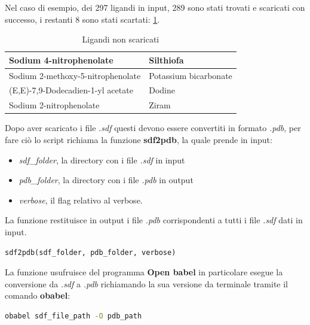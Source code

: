 Nel caso di esempio, dei 297 ligandi in input, 289 sono stati trovati e scaricati con successo, i restanti 8 sono stati scartati: \ref{tab:Ligandi scartati}.

\begin{table}[H]
    \centering
    \begin{tabular}{|l|l|}
    \hline
    Sodium 4-nitrophenolate & Silthiofa \\ \hline
    Sodium 2-methoxy-5-nitrophenolate & Potassium bicarbonate \\ \hline
    (E,E)-7,9-Dodecadien-1-yl acetate & Dodine \\ \hline
    Sodium 2-nitrophenolate & Ziram \\ \hline
    \end{tabular}
    \caption{Ligandi non scaricati}
    \label{tab:Ligandi scartati}
\end{table}

Dopo aver scaricato i file \textit{.sdf} questi devono essere convertiti in formato \textit{.pdb}, per fare ciò lo script richiama la funzione \textbf{sdf2pdb}, la quale prende in input:

\begin{itemize}
    \item \textit{sdf\_folder}, la directory con i file \textit{.sdf} in input
    \item \textit{pdb\_folder}, la directory con i file \textit{.pdb} in output
    \item \textit{verbose}, il flag relativo al verbose.
\end{itemize}

La funzione restituisce in output i file \textit{.pdb} corrispondenti a tutti i file \textit{.sdf} dati in input.

\begin{lstlisting}[language=Python, label=lst:code7, caption={funzione sdf2pdb}]
sdf2pdb(sdf_folder, pdb_folder, verbose)
\end{lstlisting}

La funzione usufruisce del programma \textbf{Open babel} in particolare esegue la conversione da \textit{.sdf} a \textit{.pdb} richiamando la sua versione da terminale tramite il comando \textbf{obabel}:

\begin{lstlisting}[language=Bash, label=lst:code8, caption={Comando per la conversione da \textit{.sdf} a \textit{.pdb}}]
obabel sdf_file_path -O pdb_path
\end{lstlisting}


